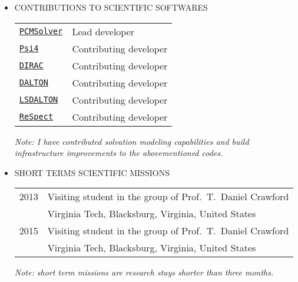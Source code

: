 \documentclass[notitlepage,a4paper,12pt]{article}
\newcommand{\pcmsolver}{\href{http://pcmsolver.readthedocs.org}{\texttt{PCMSolver}}}
\newcommand{\psicode}{\href{http://www.psicode.org}{\texttt{Psi4}}}
\newcommand{\DIRAC}{\href{http://www.diracprogram.org}{\texttt{DIRAC}}}
\newcommand{\DALTON}{\href{http://www.daltonprogram.org}{\texttt{DALTON}}}
\newcommand{\LSDALTON}{\href{http://www.daltonprogram.org}{\texttt{LSDALTON}}}
\newcommand{\ReSpect}{\href{http://respect.readthedocs.io/}{\texttt{ReSpect}}}
\begin{document}
\begin{itemize}
\pagebreak
\item CONTRIBUTIONS TO SCIENTIFIC SOFTWARES

  \begin{tabular}{ll}
 \pcmsolver{} & Lead developer \\
 \psicode{}   & Contributing developer \\
 \DIRAC{}     & Contributing developer \\
 \DALTON{}    & Contributing developer \\
 \LSDALTON{}  & Contributing developer \\
 \ReSpect{}   & Contributing developer \\
  \end{tabular}

\emph{
  Note: I have contributed solvation modeling capabilities and build infrastructure improvements
   to the abovementioned codes.}

\item SHORT TERMS SCIENTIFIC MISSIONS

  \begin{tabular}{ll}
 2013 & Visiting student in the group of Prof.~T.~Daniel Crawford \\
      & Virginia Tech, Blacksburg, Virginia, United States \\
 2015 & Visiting student in the group of Prof.~T.~Daniel Crawford \\
      & Virginia Tech, Blacksburg, Virginia, United States \\
  \end{tabular}

\emph{
  Note: short term missions are research stays shorter than three months.}

\end{itemize}
\end{document}
